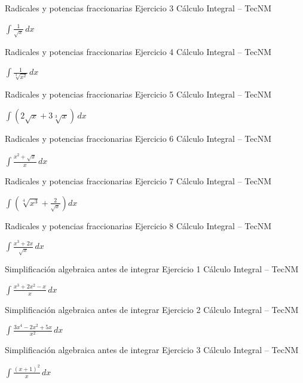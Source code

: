 \documentclass[aspectratio=169,12pt]{beamer}
\newcommand{\ejercicio}[1]{%
  \begin{center}
  \vfill
  {\fontsize{24}{30}\selectfont #1}
  \vfill
  \end{center}
}
\begin{document}
\begin{frame}{Radicales y potencias fraccionarias}
\small Ejercicio 3 \hfill Cálculo Integral -- TecNM
\ejercicio{$\displaystyle \int \frac{1}{\sqrt{x}}\,dx$}
\end{frame}

\begin{frame}{Radicales y potencias fraccionarias}
\small Ejercicio 4 \hfill Cálculo Integral -- TecNM
\ejercicio{$\displaystyle \int \frac{1}{\sqrt[3]{x^2}}\,dx$}
\end{frame}

\begin{frame}{Radicales y potencias fraccionarias}
\small Ejercicio 5 \hfill Cálculo Integral -- TecNM
\ejercicio{$\displaystyle \int(2\sqrt{x}+3\sqrt[3]{x})\,dx$}
\end{frame}

\begin{frame}{Radicales y potencias fraccionarias}
\small Ejercicio 6 \hfill Cálculo Integral -- TecNM
\ejercicio{$\displaystyle \int\frac{x^2+\sqrt{x}}{x}\,dx$}
\end{frame}

\begin{frame}{Radicales y potencias fraccionarias}
\small Ejercicio 7 \hfill Cálculo Integral -- TecNM
\ejercicio{$\displaystyle \int\left(\sqrt[4]{x^3}+\frac{2}{\sqrt{x}}\right)dx$}
\end{frame}

\begin{frame}{Radicales y potencias fraccionarias}
\small Ejercicio 8 \hfill Cálculo Integral -- TecNM
\ejercicio{$\displaystyle \int\frac{x^3+2x}{\sqrt{x}}\,dx$}
\end{frame}

\begin{frame}{Simplificación algebraica antes de integrar}
\small Ejercicio 1 \hfill Cálculo Integral -- TecNM
\ejercicio{$\displaystyle \int\frac{x^3+2x^2-x}{x}\,dx$}
\end{frame}

\begin{frame}{Simplificación algebraica antes de integrar}
\small Ejercicio 2 \hfill Cálculo Integral -- TecNM
\ejercicio{$\displaystyle \int\frac{3x^4-2x^2+5x}{x^2}\,dx$}
\end{frame}

\begin{frame}{Simplificación algebraica antes de integrar}
\small Ejercicio 3 \hfill Cálculo Integral -- TecNM
\ejercicio{$\displaystyle \int\frac{(x+1)^2}{x}\,dx$}
\end{frame}
\end{document}

